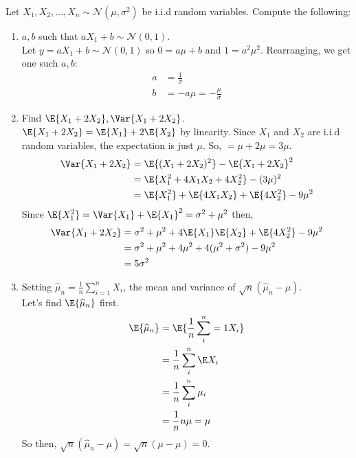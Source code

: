 \documentclass{article}
\begin{document}
\newpage
\begin{aprob}
    Let $X_1, X_2, ..., X_n \sim \mathcal{N}(\mu, \sigma^2)$ be i.i.d random variables. Compute the following:
    \begin{enumerate}
        \item {} $a,b$ such that $aX_1+b \sim \mathcal{N}(0,1)$. \\
            Let $y = aX_1+b \sim \mathcal{N}(0, 1)$ so $0 = a\mu +b$ and $1= a^2 \mu^2$. Rearranging, we get one such $a,b$:
            \begin{align*}
                a &= \frac{1}{\sigma} \\
                b &= -a \mu = - \frac{\mu}{\sigma}
            \end{align*}
        \newpage
        \item {} Find $\E{X_1 + 2X_2}, \Var{X_1 + 2X_2}$. \\
            $\E{X_1 + 2X_2} = \E{X_1} + 2\E{X_2} $ by linearity. Since $X_1$ and $X_2$ are i.i.d random variables, the expectation is just $\mu$.
            So, $ = \mu + 2 \mu = 3 \mu $. \\
            \begin{align*}
                \Var{X_1 + 2X_2} & = \E{(X_1 + 2X_2)^2} - \E{X_1 + 2X_2}^2 \\
                & = \E{X_1^2 + 4X_1 X_2 + 4X_2^2} - (3\mu)^2 \\
                & = \E{X_1^2} + \E{4X_1 X_2} + \E{4X_2^2} - 9\mu^2
            \end{align*}
            Since $\E{X_1^2} = \Var{X_1} + \E{X_1}^2  = \sigma^2 + \mu^2$ then,
            \begin{align*}
                \Var{X_1 + 2X_2} & = \sigma^2 + \mu^2 + 4\E{X_1} \E{X_2} + \E{4X_2^2} - 9\mu^2 \\
                & = \sigma^2 + \mu^2 + 4 \mu^2 + 4(\mu^2+\sigma^2) - 9\mu^2\\
                & = 5\sigma^2
            \end{align*}
        \newpage
        \item {} Setting $\widehat{\mu}_n = \frac{1}{n} \sum_{i=1}^n X_i$, the mean and variance of $\sqrt{n}(\widehat{\mu}_n - \mu)$.\\
            Let's find $\E{\widehat{\mu}_n}$ first.
            \begin{align*}
                \E{\widehat{\mu}_n} & = \E{\frac{1}{n}\sum^n_i=1 X_i}\\
                & = \frac{1}{n}\sum^n_i \E X_i \\
                & = \frac{1}{n} \sum^n_i \mu_i \\
                & = \frac{1}{n} n \mu = \mu \\
            \end{align*}
            So then, $\sqrt{n}(\widehat{\mu}_n - \mu) = \sqrt{n} (\mu - \mu) = 0$.
    \end{enumerate}
\end{aprob}
\end{document}
